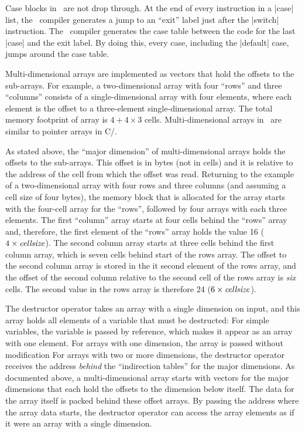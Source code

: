   Case blocks in \Small\ are not drop through. At the end of every instruction
  in a |case| list, the \Small\ compiler generates a jump to an ``exit'' label
  just after the |switch| instruction. The \Small\ compiler generates the case
  table between the code for the last |case| and the exit label. By doing this,
  every case, including the |default| case, jumps around the case table.

\list{\lbullet}
  Multi-dimensional arrays are implemented as vectors that hold the offsets to
  the sub-arrays. For example, a two-dimensional array with four ``rows''
  and three ``columns'' consists of a single-dimensional array with four
  elements, where each element is the offset to a three-element
  single-dimensional array. The total memory footprint of array is
  $4+4\times 3$ cells. Multi-dimensional arrays in \Small\ are similar to
  pointer arrays in C/\Cpp.

  As stated above, the ``major dimension'' of multi-dimensional arrays holds
  the offsets to the sub-arrays. This offset is in bytes (not in cells) and it
  is relative to the address of the cell from which the offset was read.
  Returning to the example of a two-dimensional array with four rows and three
  columns (and assuming a cell size of four bytes), the memory block that is
  allocated for the array starts with the four-cell array for the ``rows'',
  followed by four arrays with each three elements. The first ``column'' array
  starts at four cells behind the ``rows'' array and, therefore, the first
  element of the ``rows'' array holds the value 16 ($4\times {\it cell size}$).
  The second column array starts at three cells behind the first column array,
  which is seven cells behind start of the rows array. The
  offset to the second column array is stored in the {it second\/} element of
  the rows array, and the offset of the second column relative to the second
  cell of the rows array is {\it six\/} cells. The second value in the rows
  array is therefore 24 ($6\times {\it cell size}$).

\list{\lbullet}
  The destructor operator takes an array with a single dimension on input, and
  this array holds all elements of a variable that must be destructed:
  \beginlist{1em}\compactlist
  \list{\llbullet}
    For simple variables, the variable is passed by reference, which makes it
    appear as an array with one element.
  \list{\llbullet}
    For arrays with one dimension, the array is passed without modification
  \list{\llbullet}
    For arrays with two or more dimensions, the destructor operator receives
    the address {\it behind\/} the ``indirection tables'' for the major dimensions.
    As documented above, a multi-dimensional array starts with vectors for the
    major dimensions that each hold the offsets to the dimension below itself.
    The data for the array itself is packed behind these offset arrays. By
    passing the address where the array data starts, the destructor operator
    can access the array elements as if it were an array with a single dimension.
  \endlist

